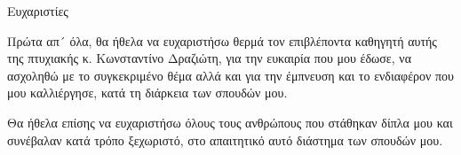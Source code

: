 \newpage

\begin{center}
Ευχαριστίες
\end{center}


Πρώτα απ´ όλα, θα ήθελα να ευχαριστήσω θερμά τον επιβλέποντα καθηγητή αυτής της πτυχιακής κ. Κωνσταντίνο Δραζιώτη, για την ευκαιρία που μου έδωσε, να ασχοληθώ με το συγκεκριμένο θέμα αλλά και για την έμπνευση και το ενδιαφέρον που μου καλλιέργησε, κατά τη διάρκεια των σπουδών μου. 
  
Θα ήθελα επίσης να ευχαριστήσω όλους τους ανθρώπους που στάθηκαν δίπλα μου και συνέβαλαν κατά τρόπο ξεχωριστό, στο απαιτητικό αυτό διάστημα των σπουδών μου.


